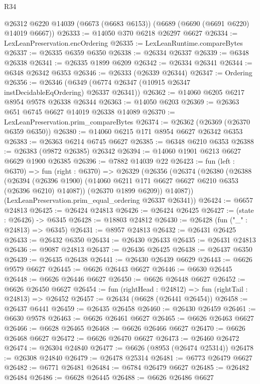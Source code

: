 \begin{lexlean}{R34}
\begin{coremodule}
    @26312
    @6220
    @14039
    (@6673 (@6683 @6153))
    (@6689 (@6690 (@6691 @6220) @14019 @6667))
@26333 := @14050 @370 @6218 @26297 @6627
@26334 := LexLeanPreservation.encOrdering
@26335 := LexLeanRuntime.compareBytes
@26337 := @26335 @6359 @6350
@26338 := @26334 @26337
@26339 := @6348 @26338
@26341 := @26335 @1899 @6209
@26342 := @26334 @26341
@26344 := @6348 @26342 @6353
@26346 := @26333 (@26339 @26344)
@26347 := Ordering
@26356 := @26346 (@6349 (@6774 @26347 (@10915 @26347 instDecidableEqOrdering) @26337 @26341))
@26362 := @14060 @6205 @6217 @8954 @9578 @26338 @26344
@26363 := @14050 @6203
@26369 := @26363 @651 @6745 @6627 @14019 @26338 @14089
@26370 := LexLeanPreservation.prim_compareBytes
@26374 := @26362 (@26369 (@26370 @6359 @6350))
@26380 := @14060 @6215 @171 @8954 @6627 @26342 @6353
@26383 := @26363 @6214 @6745 @6627
@26385 := @6348 @6210 @6353
@26388 := @26383 (@9872 @26385) @26342
@26394 := @14060 @1901 @6213 @6627 @6629 @1900 @26385
@26396 := @7882 @14039 @22
@26423 := fun (left : @6370) =>
  fun (right : @6370) =>
  @26329
    (@26356
      (@26374
        (@26380
          (@26388
            (@26394
              (@26396 @1900)
              (@14060 @6211 @171 @6627 @6627 @6210 @6353 (@26396 @6210) @14087))
            (@26370 @1899 @6209))
          @14087))
      (LexLeanPreservation.prim_equal_ordering @26337 @26341))
@26424 := @6657 @24813
@26425 := @26424 @24813
@26426 := @26424 @26425
@26427 := (state : @26426) -> @6345
@26428 := @18803 @24812
@26430 := @26428 (fun ("_" : @24813) => @6345)
@26431 := @8957 @24813
@26432 := @26431 @26425
@26433 := @26432 @6350
@26434 := @26430 @26433
@26435 := @26431 @24813
@26436 := @9087 @24813
@26437 := @26436 @26425
@26438 := @26437 @6350
@26439 := @26435 @26438
@26441 := @26430 @26439 @6629
@26443 := @6626 @9579 @6627
@26445 := @6626 @26443 @6627
@26446 := @6630 @26445
@26448 := @6626 @26446 @6627
@26450 := @6626 @26448 @6627
@26452 := @6626 @26450 @6627
@26454 := fun (rightHead : @24812) => fun (rightTail : @24813) => @26452
@26457 := @26434 (@6628 (@26441 @26454))
@26458 := @26437 @6441
@26459 := @26435 @26458
@26460 := @26430 @26459
@26461 := @6630 @9578
@26463 := @6626 @26461 @6627
@26465 := @6626 @26463 @6627
@26466 := @6628 @26465
@26468 := @6626 @26466 @6627
@26470 := @6626 @26468 @6627
@26472 := @6626 @26470 @6627
@26473 := @26460 @26472
@26474 := @26304 @24840
@26477 := @6626 (@8953 (@26474 @25314))
@26478 := @26308 @24840
@26479 := @26478 @25314
@26481 := @6773 @26479 @6627
@26482 := @6771 @26481
@26484 := @6784 @26479 @6627
@26485 := @26482 @26484
@26486 := @6628 @26445
@26488 := @6626 @26486 @6627

\end{coremodule}
\end{lexlean}
